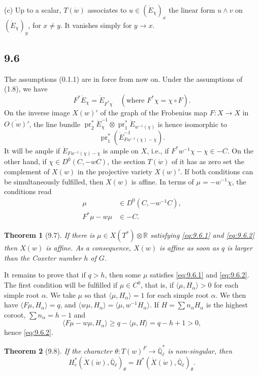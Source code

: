 \documentclass[11pt]{amsart}
\theoremstyle{plain}
\newtheorem{theorem}{Theorem}[section]
\theoremstyle{remark}
\DeclareMathOperator{\pr}{pr}
\begin{document}
(c) Up to a scalar, $T(\dot{w})$ associates to $u \in (\dot{E}_\chi)_x$ the linear form $u \wedge v$ on $(\dot{E}_\chi)_y$, for $x \neq y$. It vanishes simply for $y \to x$.

\subsection{9.6} The assumptions (0.1.1) are in force from now on. Under the assumptions of (1.8), we have
\[
F^* \dot{E}_\chi = \dot{E}_{F^*\chi} \quad (\text{where } F^*\chi = \chi \circ F).
\]
On the inverse image $X(w)'$ of the graph of the Frobenius map $F: X \to X$ in $\overline{O(w)}'$, the line bundle $\pr_2^* \dot{E}_\chi^{-1} \otimes \pr_1^* \dot{E}_{w^{-1}(\chi)}$ is hence isomorphic to
\[
\pr_1^*(\dot{E}_{Fw^{-1}(\chi) - \chi}^{-1}).
\]
It will be ample if $\dot{E}_{Fw^{-1}(\chi) - \chi}$ is ample on $X$, i.e., if $F^*w^{-1}\chi - \chi \in -C$. On the other hand, if $\chi \in D^0(C, -wC)$, the section $T(\dot{w})$ of it has as zero set the complement of $X(w)$ in the projective variety $X(w)'$. If both conditions can be simultaneously fulfilled, then $X(w)$ is affine. In terms of $\mu = -w^{-1}\chi$, the conditions read
\begin{align}
\label{eq:9.6.1} \mu &\in D^0(C, -w^{-1}C), \\
\label{eq:9.6.2} F^*\mu - w\mu &\in -C.
\end{align}

\begin{theorem}[9.7]
If there is $\mu \in X(T^*) \otimes \mathbb{R}$ satisfying \eqref{eq:9.6.1} and \eqref{eq:9.6.2} then $X(w)$ is affine. As a consequence, $X(w)$ is affine as soon as $q$ is larger than the Coxeter number $h$ of $G$.
\end{theorem}

It remains to prove that if $q > h$, then some $\mu$ satisfies \eqref{eq:9.6.1} and \eqref{eq:9.6.2}. The first condition will be fulfilled if $\mu \in C^0$, that is, if $\langle \mu, H_\alpha \rangle > 0$ for each simple root $\alpha$. We take $\mu$ so that $\langle \mu, H_\alpha \rangle = 1$ for each simple root $\alpha$. We then have $\langle F\mu, H_\alpha \rangle = q$, and $\langle w\mu, H_\alpha \rangle = \langle \mu, w^{-1}H_\alpha \rangle$. If $H = \sum n_\alpha H_\alpha$ is the highest coroot, $\sum n_\alpha = h - 1$ and
\[
\langle F\mu - w\mu, H_\alpha \rangle \ge q - \langle \mu, H \rangle = q - h + 1 > 0,
\]
hence \eqref{eq:9.6.2}.

\begin{theorem}[9.8]
If the character $\theta: T(w)^F \to \overline{\mathbb{Q}}_\ell^*$ is non-singular, then
\[
H_c^*(\dot{X}(\dot{w}), \overline{\mathbb{Q}}_\ell)_\theta = H^*(\dot{X}(\dot{w}), \overline{\mathbb{Q}}_\ell)_\theta.
\]
\end{theorem}
\end{document}
